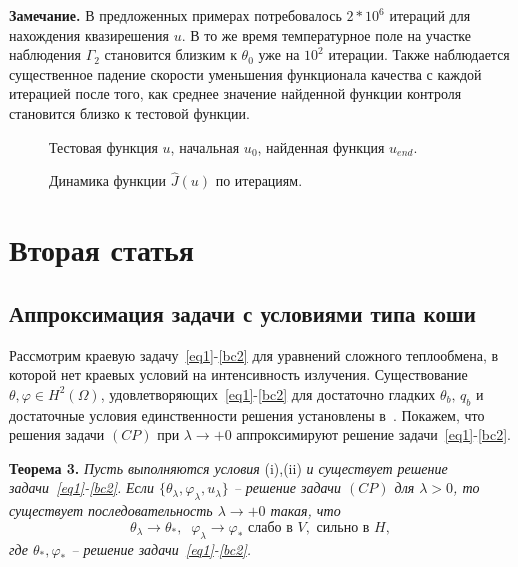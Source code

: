 \textbf{Замечание.} В предложенных примерах потребовалось $2*10^6$ итераций для нахождения квазирешения $u$.
В то же время температурное поле на участке наблюдения $\Gamma_2$ становится близким
к $\theta_0$ уже на $10^2$ итерации.
Также наблюдается существенное падение скорости уменьшения функционала качества с
каждой итерацией после того, как среднее значение найденной функции контроля
становится близко к тестовой функции.
\begin{figure}
    \centering
    \caption{Тестовая функция $u$, начальная $u_0$, найденная функция $u_{end}.$}
    \label{fig:control}
\end{figure}

\begin{figure}
    \centering
    \caption{Динамика функции $\hat{J}(u)$ по итерациям.}
    \label{fig:cost}
\end{figure}

\clearpage


\section{Вторая статья}\label{sec:ch4/sec2}

\subsection{Аппроксимация задачи с условиями типа коши}\label{subsec:ch3/3_1}
Рассмотрим краевую задачу~\eqref{eq1}-\eqref{bc2} для уравнений сложного теплообмена, в которой нет краевых условий на
интенсивность излучения.
Существование $\theta,\varphi\in H^2(\Omega)$, удовлетворяющих~\eqref{eq1}-\eqref{bc2}
для достаточно гладких
$\theta_b,\, q_b$ и достаточные условия единственности решения
установлены в~\cite{CMMP20}.
Покажем, что решения задачи $(CP)$ при $\lambda\to+0$
аппроксимируют решение задачи~\eqref{eq1}-\eqref{bc2}.


\textbf{Теорема 3.}
\textit{Пусть выполняются условия} (i),(ii) \textit{и существует решение задачи~\eqref{eq1}-\eqref{bc2}.}
        \textit{ Если $\{\theta_\lambda,\varphi_\lambda,u_\lambda\}$ -- решение
задачи $(CP)$ для $\lambda>0$, то существует последовательность
$\lambda\to +0$
такая, что}
\[
    \theta_\lambda\rightarrow\theta_*, \;\; \varphi_\lambda\rightarrow\varphi_*
    \text{ слабо в }V,\text{ сильно в }H,
\]
        \textit{где $\theta_*,\varphi_*$ -- решение задачи~\eqref{eq1}-\eqref{bc2}.}

